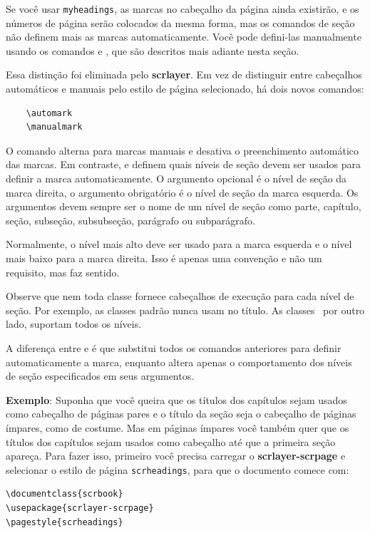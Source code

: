 Se você usar \texttt{myheadings}, as marcas no cabeçalho da página ainda existirão, e os números de página serão colocados da mesma forma, mas os comandos de seção não definem mais as marcas automaticamente. Você pode defini-las manualmente usando os comandos  e , que são descritos mais adiante nesta seção.

Essa distinção foi eliminada pelo \textbf{scrlayer}. Em vez de distinguir entre cabeçalhos automáticos e manuais pelo estilo de página selecionado, há dois novos comandos:
\begin{verbatim}
    \automark
    \manualmark
\end{verbatim}

O comando  alterna para marcas manuais e desativa o preenchimento automático das marcas. Em contraste,  e  definem quais níveis de seção devem ser usados para definir a marca automaticamente. O argumento opcional é o nível de seção da marca direita, o argumento obrigatório é o nível de seção da marca esquerda. Os argumentos devem sempre ser o nome de um nível de seção como parte, capítulo, seção, subseção, subsubseção, parágrafo ou subparágrafo.

Normalmente, o nível mais alto deve ser usado para a marca esquerda e o nível mais baixo para a marca direita. Isso é apenas uma convenção e não um requisito, mas faz sentido.

Observe que nem toda classe fornece cabeçalhos de execução para cada nível de seção. Por exemplo, as classes padrão nunca usam  no título. As classes \KOMAScript\ por outro lado, suportam todos os níveis.

A diferença entre  e  é que  substitui todos os comandos anteriores para definir automaticamente a marca, enquanto  altera apenas o comportamento dos níveis de seção especificados em seus argumentos.

\textbf{Exemplo}: Suponha que você queira que os títulos dos capítulos sejam usados como cabeçalho de páginas pares e o título da seção seja o cabeçalho de páginas ímpares, como de costume. Mas em páginas ímpares você também quer que os títulos dos capítulos sejam usados como cabeçalho até que a primeira seção apareça. Para fazer isso, primeiro você precisa carregar o \textbf{scrlayer-scrpage} e selecionar o estilo de página \texttt{scrheadings}, para que o documento comece com:
\begin{verbatim}
\documentclass{scrbook}
\usepackage{scrlayer-scrpage}
\pagestyle{scrheadings} 
\end{verbatim}

